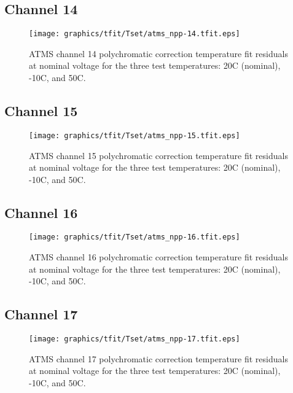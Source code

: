 \subsection{Channel 14}
\begin{figure}[H]
  \label{fig:Tset.ch14_tfit}
  \centering
  \texttt{[image: graphics/tfit/Tset/atms\_npp-14.tfit.eps]}
  \caption{ATMS channel 14 polychromatic correction temperature fit residuals at nominal voltage for the three test temperatures: 20\textdegree{}C (nominal), -10\textdegree{}C, and 50\textdegree{}C.}
\end{figure}

\subsection{Channel 15}
\begin{figure}[H]
  \label{fig:Tset.ch15_tfit}
  \centering
  \texttt{[image: graphics/tfit/Tset/atms\_npp-15.tfit.eps]}
  \caption{ATMS channel 15 polychromatic correction temperature fit residuals at nominal voltage for the three test temperatures: 20\textdegree{}C (nominal), -10\textdegree{}C, and 50\textdegree{}C.}
\end{figure}

\subsection{Channel 16}
\begin{figure}[H]
  \label{fig:Tset.ch16_tfit}
  \centering
  \texttt{[image: graphics/tfit/Tset/atms\_npp-16.tfit.eps]}
  \caption{ATMS channel 16 polychromatic correction temperature fit residuals at nominal voltage for the three test temperatures: 20\textdegree{}C (nominal), -10\textdegree{}C, and 50\textdegree{}C.}
\end{figure}

\subsection{Channel 17}
\begin{figure}[H]
  \label{fig:Tset.ch17_tfit}
  \centering
  \texttt{[image: graphics/tfit/Tset/atms\_npp-17.tfit.eps]}
  \caption{ATMS channel 17 polychromatic correction temperature fit residuals at nominal voltage for the three test temperatures: 20\textdegree{}C (nominal), -10\textdegree{}C, and 50\textdegree{}C.}
\end{figure}

